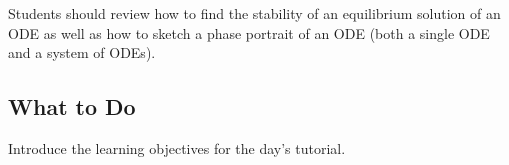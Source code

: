 Students should review how to find the stability of an equilibrium solution of an ODE as well as how to sketch a phase portrait of an ODE (both a single ODE and a system of ODEs).


\subsection*{What to Do}
	
Introduce the learning objectives for the day's tutorial. \\






%
	
	

	
	
